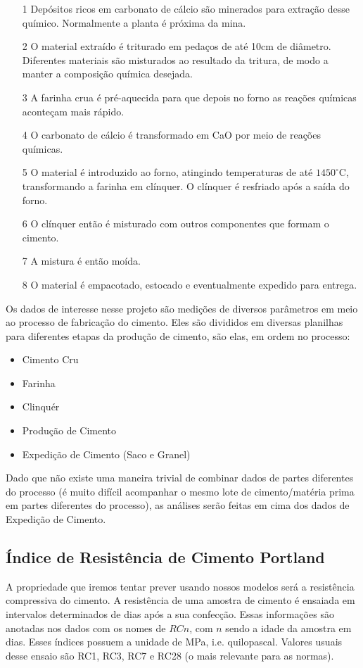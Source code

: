 \begin{itemize}

\item[1] Depósitos ricos em carbonato de cálcio são minerados para extração desse químico. Normalmente a planta é próxima da mina.
\item[2] O material extraído é triturado em pedaços de até 10cm de diâmetro. Diferentes materiais são misturados ao resultado da tritura, de modo a manter a composição química desejada. 
\item[3] A farinha crua é pré-aquecida para que depois no forno as reações químicas aconteçam mais rápido. 
\item[4] O carbonato de cálcio é transformado em CaO por meio de reações químicas.  
\item[5] O material é introduzido ao forno, atingindo temperaturas de até $1450^\circ$C, transformando a farinha em clínquer. O clínquer é resfriado após a saída do forno. 
\item[6] O clínquer então é misturado com outros componentes que formam o cimento.
\item[7] A mistura é então moída.
\item[8] O material é empacotado, estocado e eventualmente expedido para entrega.

\end{itemize}

Os dados de interesse nesse projeto são medições de diversos parâmetros em meio ao processo de fabricação do cimento. Eles são divididos em diversas planilhas para diferentes etapas da produção de cimento, são elas, em ordem no processo:

\begin{itemize}
        \item Cimento Cru
        \item Farinha
        \item Clinquér
        \item Produção de Cimento
        \item Expedição de Cimento (Saco e Granel)
\end{itemize}

Dado que não existe uma maneira trivial de combinar dados de partes diferentes do processo (é muito difícil acompanhar o mesmo lote de cimento/matéria prima em partes diferentes do processo), as análises serão feitas em cima dos dados de Expedição de Cimento.

\subsection{Índice de Resistência de Cimento Portland}
\label{sec:rc}
A propriedade que iremos tentar prever usando nossos modelos será a resistência
compressiva do cimento. A resistência de uma amostra de cimento é ensaiada em
intervalos determinados de dias após a sua confecção. Essas informações são
anotadas nos dados com os nomes de $RCn$, com $n$ sendo a idade da amostra em
dias. Esses índices possuem a unidade de MPa, i.e. quilopascal. Valores usuais
desse ensaio são RC1, RC3, RC7 e RC28 (o mais relevante para as normas).

